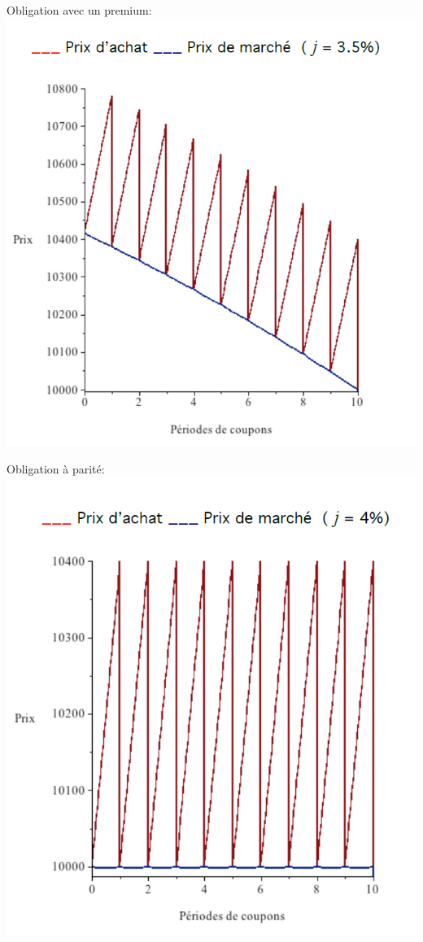 \documentclass[11pt,french]{report}
\begin{document}
Obligation avec un premium:
\\
\includegraphics[scale=0.40]{picture15.PNG} 

Obligation à parité:
\\
\includegraphics[scale=0.40]{picture16.PNG}
\end{document}
